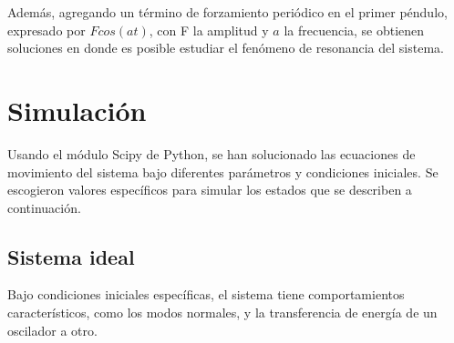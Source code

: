 \documentclass[%
 aip,
rsi,%
 amsmath,amssymb,
 reprint,%
]{revtex4-1}
\begin{document}
Adem\'as, agregando un t\'ermino de forzamiento peri\'odico en el primer p\'endulo, expresado por $Fcos(at)$, con F la amplitud y $a$ la frecuencia, se obtienen soluciones en donde es posible estudiar el fen\'omeno de resonancia del sistema.

\section{Simulaci\'on}
Usando el m\'odulo Scipy de Python, se han solucionado las ecuaciones de movimiento del sistema bajo diferentes par\'ametros y condiciones iniciales. Se escogieron valores espec\'ificos para simular los estados que se describen a continuaci\'on.

\subsection{Sistema ideal}
Bajo condiciones iniciales espec\'ificas, el sistema tiene comportamientos caracter\'isticos, como los modos normales, y la transferencia de energ\'ia de un oscilador a otro.
\end{document}
